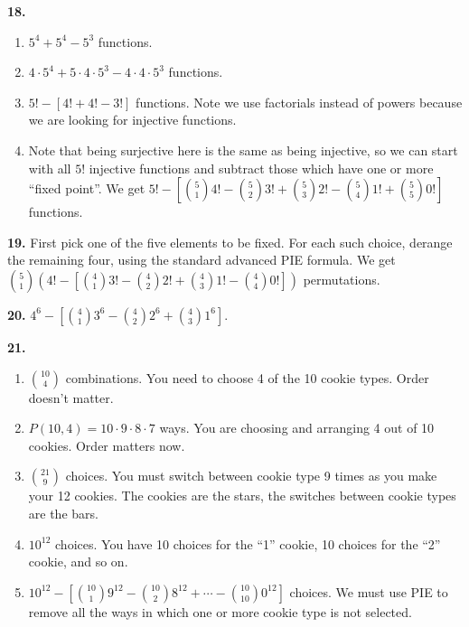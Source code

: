 \documentclass[10pt,]{book}
\theoremstyle{plain}
\theoremstyle{definition}
\theoremstyle{definition}
\theoremstyle{definition}
\numberwithin{equation}{section}
\begin{document}
\par\smallskip
\noindent\textbf{18.}\quad{}
          \leavevmode%
\begin{enumerate}[label=(\alph*)]
\item\hypertarget{li-757}{}\(5^4 + 5^4 - 5^3\) functions. %
\item\hypertarget{li-758}{}\(4\cdot 5^4 + 5 \cdot 4 \cdot 5^3 - 4 \cdot 4 \cdot 5^3\) functions.%
\item\hypertarget{li-759}{}\(5! - \left[ 4! + 4! - 3! \right]\) functions.  Note we use factorials instead of powers because we are looking for injective functions.%
\item\hypertarget{li-760}{}Note that being surjective here is the same as being injective, so we can start with all \(5!\) injective functions and subtract those which have one or more ``fixed point''.  We get \(5! - \left[{5 \choose 1}4! - {5 \choose 2}3! + {5 \choose 3}2! - {5 \choose 4}1! + {5 \choose 5} 0!\right]\) functions.%
\end{enumerate}

\par\smallskip
\noindent\textbf{19.}\quad{} First pick one of the five elements to be fixed.  For each such choice, derange the remaining four, using the standard advanced PIE formula.  We get
            \({5 \choose 1}\left( 4! - \left[{4 \choose 1}3! - {4 \choose 2}2! + {4 \choose 3} 1! - {4 \choose 4} 0!\right] \right)\) permutations.
\par\smallskip
\noindent\textbf{20.}\quad{}
            \(4^6 - \left[{4 \choose 1}3^6 - {4 \choose 2}2^6 + {4 \choose 3} 1^6 \right]\).
\par\smallskip
\noindent\textbf{21.}\quad{}
          \leavevmode%
\begin{enumerate}[label=(\alph*)]
\item\hypertarget{li-766}{}\({10 \choose 4}\) combinations. You need to choose 4 of the 10 cookie types. Order doesn't matter.%
\item\hypertarget{li-767}{}\(P(10, 4) = 10 \cdot 9 \cdot 8 \cdot 7\) ways. You are choosing and arranging 4 out of 10 cookies. Order matters now.%
\item\hypertarget{li-768}{}\({21 \choose 9}\) choices. You must switch between cookie type 9 times as you make your 12 cookies. The cookies are the stars, the switches between cookie types are the bars.%
\item\hypertarget{li-769}{}\(10^{12}\) choices. You have 10 choices for the ``1'' cookie, 10 choices for the ``2'' cookie, and so on.%
\item\hypertarget{li-770}{}\(10^{12} - \left[{10 \choose 1}9^{12} - {10 \choose 2}8^{12} + \cdots - {10 \choose 10}0^{12}   \right]\) choices. We must use PIE to remove all the ways in which one or more cookie type is not selected.%
\end{enumerate}
\end{document}
